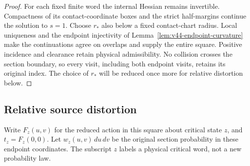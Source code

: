 \begin{proof}
For each fixed finite word the internal Hessian remains invertible.
Compactness of its contact-coordinate boxes and the strict half-margins
continue the solution to $s=1$. Choose $r_*$ also below a fixed
contact-chart radius. Local uniqueness and the endpoint injectivity
of Lemma~\ref{lem:v44-endpoint-curvature} make the continuations agree
on overlaps and supply the entire square. Positive incidence and
clearance retain physical admissibility. No collision crosses the
section boundary, so every visit, including both endpoint visits,
retains its original index. The choice of $r_*$ will be reduced once
more for relative distortion below.
\end{proof}

\subsection{Relative source distortion}
Write $F_z(u,v)$ for the reduced action in this square about critical
state $z$, and $t_z=F_z(0,0)$. Let $w_z(u,v)\,du\,dv$ be the original
section probability in these endpoint coordinates. The subscript $z$
labels a physical critical word, not a new probability law.

